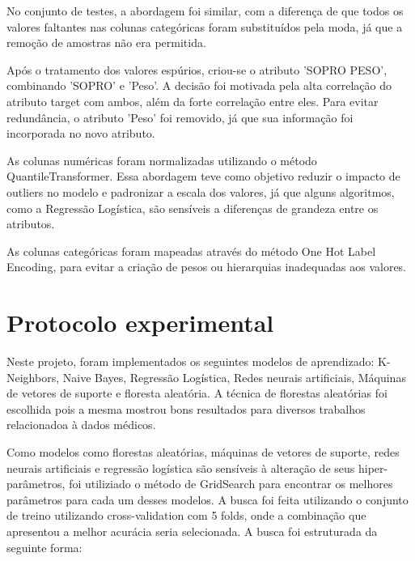 \documentclass[10pt, conference, compsocconf]{IEEEtran}
\begin{document}
No conjunto de testes, a abordagem foi similar, com a diferença de que todos os valores faltantes nas colunas categóricas foram substituídos pela moda, já que a remoção de amostras não era permitida.

Após o tratamento dos valores espúrios, criou-se o atributo 'SOPRO PESO', combinando 'SOPRO' e 'Peso'. A decisão foi motivada pela alta correlação do atributo target com ambos, além da forte correlação entre eles. Para evitar redundância, o atributo 'Peso' foi removido, já que sua informação foi incorporada no novo atributo.

As colunas numéricas foram normalizadas utilizando o método QuantileTransformer. Essa abordagem teve como objetivo reduzir o impacto de outliers no modelo e padronizar a escala dos valores, já que alguns algoritmos, como a Regressão Logística, são sensíveis a diferenças de grandeza entre os atributos.

As colunas categóricas foram mapeadas através do método One Hot Label Encoding, para evitar a criação de pesos ou hierarquias inadequadas aos valores.


\section{Protocolo experimental}
Neste projeto, foram implementados os seguintes modelos de aprendizado: K-Neighbors, Naive Bayes, Regressão Logística,
Redes neurais artificiais, Máquinas de vetores de suporte e floresta aleatória.
A técnica de florestas aleatórias foi escolhida pois a mesma mostrou bons resultados para diversos trabalhos relacionadoa à dados médicos.

Como modelos como florestas aleatórias, máquinas de vetores de suporte, redes neurais artificiais e regressão logística são sensíveis à alteração de seus hiper-parâmetros, foi utiliziado o método de GridSearch para encontrar os melhores parâmetros para cada um desses modelos. A busca foi feita utilizando o conjunto de treino utilizando cross-validation com 5 folds, onde a combinação que apresentou a melhor acurácia seria selecionada.
A  busca foi estruturada da seguinte forma:
\vspace{0.3cm}
\end{document}
